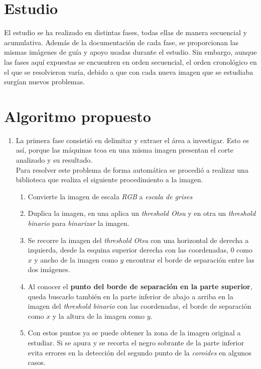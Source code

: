 \section{Estudio}
El estudio se ha realizado en distintas fases, todas ellas de manera
secuencial y acumulativa. Además de la documentación de cada fase, se
proporcionan las mismas imágenes de guía y apoyo usadas durante el
estudio.  Sin embargo, aunque las fases aquí expuestas se encuentren
en orden secuencial, el orden cronológico en el que se resolvieron
varía, debido a que con cada nueva imagen que se estudiaba surgían
nuevos problemas.

\section{Algoritmo propuesto}
\begin{enumerate}
\item La primera fase consistió en delimitar y extraer el área a
  investigar. Esto es así, porque las máquinas \gls{tcoa} en una misma
  imagen presentan el corte analizado y su resultado.\\
  Para resolver este problema de forma automática se procedió a
  realizar una biblioteca que realiza el siguiente procedimiento a la
  imagen.
  \begin{enumerate}[label*=\arabic*.]
  \item Convierte la imagen de escala \emph{RGB} a \emph{escala de
      grises}
  \item Duplica la imagen, en una aplica un \emph{threshold Otsu} y en
    otra un \emph{threshold binario} para \emph{binarizar} la imagen.
  \item Se recorre la imagen del \emph{threshold Otsu} con una
    horizontal de derecha a izquierda, desde la esquina superior
    derecha con las coordenadas, 0 como $x$ y ancho de la imagen como
    $y$ encontrar el borde de separación entre las dos imágenes.
  \item Al conocer el  \textbf{punto del borde de separación en la parte
    superior}, queda buscarlo también en la parte inferior de abajo a arriba en la
    imagen del \emph{threshold binario} con las coordenadas, el borde
    de separación como $x$ y la altura de la imagen como $y$.
  \item Con estos puntos ya se puede obtener la zona de la imagen
    original a estudiar. Si se apura y se recorta el negro sobrante de
    la parte inferior evita errores en la detección del segundo punto
    de la \emph{coroides} en algunos casos.

\end{enumerate}
\end{enumerate}

